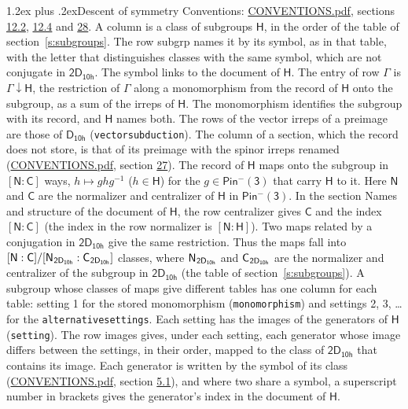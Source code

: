 \documentclass[10pt,a4paper]{article}
\makeatletter
\renewcommand\section{\@startsection{section}{1}{\z@}{-3ex plus -1ex minus -.2ex}%
  {1.2ex plus .2ex}{\normalfont\large\sffamily\bfseries\color{parttitle}}}
\numberwithin{equation}{section}
\newcommand{\grp}[1]{\mathsf{#1}}
\newcommand{\grpindex}[2]{[#1 : #2]}
\newcommand{\restr}[2]{#1\!\downarrow#2}
\newcommand{\hairsp}{\mkern1mu}
\makeatother
\begin{document}
\section{Descent of symmetry}\label{s:subduction}
Conventions: \href{../../CONVENTIONS.pdf}{CONVENTIONS.pdf}, sections \href{../../../rotation/CONVENTIONS.pdf\#conv.12.2}{12.2}, \href{../../../rotation/CONVENTIONS.pdf\#conv.12.4}{12.4} and \href{../../CONVENTIONS.pdf\#conv.28}{28}.
A column is a class of subgroups $\grp{H}$, in the order of the table of section~\ref{s:subgroups}. The row subgrp names it by its symbol, as in that table, with the letter that distinguishes classes with the same symbol, which are not conjugate in $\grp{2D_{10h}}$. The symbol links to the document of $\grp{H}$. The entry of row $\Gamma$ is $\restr{\Gamma}{\grp{H}}$, the restriction of $\Gamma$ along a monomorphism from the record of $\grp{H}$ onto the subgroup, as a sum of the irreps of $\grp{H}$. The monomorphism identifies the subgroup with its record, and $\grp{H}$ names both. The rows of the vector irreps of a preimage are those of \href{../../../rotation/data/pdf/D10h.pdf}{$\grp{D_{10h}}$} (\texttt{vectorsubduction}). The column of a section, which the record does not store, is that of its preimage with the spinor irreps renamed (\href{../../CONVENTIONS.pdf}{CONVENTIONS.pdf}, section \href{../../CONVENTIONS.pdf\#conv.27}{27}). \label{n:group.normalizer.o3}\label{n:group.centralizer.o3}\label{n:element.h}The record of $\grp{H}$ maps onto the subgroup in $\grpindex{\grp{N}}{\grp{C}}$ ways, $h \mapsto g h g^{-1}$ ($h \in \grp{H}$) for the $g \in \grp{Pin^{-}(3)}$ that carry $\grp{H}$ to it. Here $\grp{N}$ and $\grp{C}$ are the normalizer and centralizer of $\grp{H}$ in \href{Pinminus3.pdf}{$\grp{Pin^{-}(3)}$}. In the section Names and structure of the document of $\grp{H}$, the row centralizer gives $\grp{C}$ and the index $\grpindex{\grp{N}}{\grp{C}}$ (the index in the row normalizer is $\grpindex{\grp{N}}{\grp{H}}$). Two maps related by a conjugation in $\grp{2D_{10h}}$ give the same restriction. Thus the maps fall into $\grpindex{\grp{N}}{\grp{C}}/\grpindex{\grp{N}_{\hairsp \grp{2D_{10h}}}}{\grp{C}_{\hairsp \grp{2D_{10h}}}}$ classes, where $\grp{N}_{\hairsp \grp{2D_{10h}}}$ and $\grp{C}_{\hairsp \grp{2D_{10h}}}$ are the normalizer and centralizer of the subgroup in $\grp{2D_{10h}}$ (the table of section~\ref{s:subgroups}). \label{n:head.setting}A subgroup whose classes of maps give different tables has one column for each table: setting 1 for the stored monomorphism (\texttt{monomorphism}) and settings 2, 3, \dots{} for the \texttt{alternativesettings}. Each setting has the images of the generators of $\grp{H}$ (\texttt{setting}). \label{n:head.images}The row images gives, under each setting, each generator whose image differs between the settings, in their order, mapped to the class of $\grp{2D_{10h}}$ that contains its image. \label{n:element.generator.index}Each generator is written by the symbol of its class (\href{../../CONVENTIONS.pdf}{CONVENTIONS.pdf}, section \href{../../../rotation/CONVENTIONS.pdf\#conv.5.1}{5.1}), and where two share a symbol, a superscript number in brackets gives the generator's index in the document of $\grp{H}$. 
\end{document}
